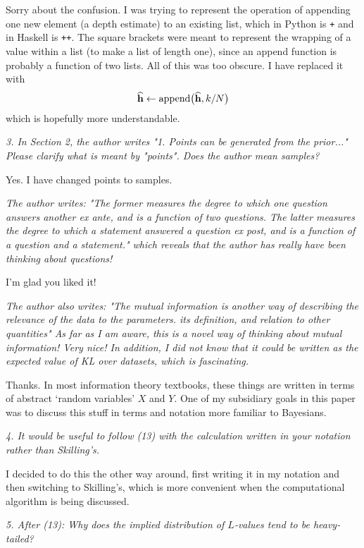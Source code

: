 \documentclass[a4paper, 12pt]{article}
\renewcommand{\quote}{\em \color{orange}}
\begin{document}
Sorry about the confusion. I was trying to represent the operation of
appending one new element (a depth estimate)
to an existing list, which in Python is {\tt +}
and in Haskell is {\tt ++}. The square brackets were meant to represent
the wrapping of a value within a list (to make a list of length one),
since an append function is probably a function of two lists.
All of this was too obscure. I have replaced it with
\begin{align}
\widehat{\mathbf{h}} \leftarrow \textnormal{append}\big(\widehat{\mathbf{h}}, k/N\big)
\end{align}
which is hopefully more understandable.

{\quote
3. In Section 2, the author writes "1. Points can be generated from the prior..."  Please clarify what is meant by "points".  Does the author mean samples?}

Yes. I have changed points to samples.

{\quote
The author writes:
"The former measures the degree to which one question answers another ex ante, and is a function of two questions. The latter measures the degree to which a statement answered a question ex post, and is a function of a question and a statement."
which reveals that the author has really have been thinking about questions!}

I'm glad you liked it!

{\quote
The author also writes:
"The mutual information is another way of describing the relevance of the data to the parameters. its definition, and relation to other quantities"
As far as I am aware, this is a novel way of thinking about mutual information!  Very nice!
In addition, I did not know that it could be written as the expected value of KL over datasets, which is fascinating.}

Thanks. In most information theory textbooks, these things are written in
terms of abstract `random variables' $X$ and $Y$. One of my subsidiary
goals in this paper was to discuss this stuff in terms and notation more
familiar to Bayesians.

{\quote
4. It would be useful to follow (13) with the calculation written in your notation rather than Skilling's.}

I decided to do this the other way around, first writing it in my notation and
then switching to Skilling's, which is more convenient when the computational
algorithm is being discussed.

{\quote
5. After (13): Why does the implied distribution of $L$-values tend to be heavy-tailed?}
\end{document}
